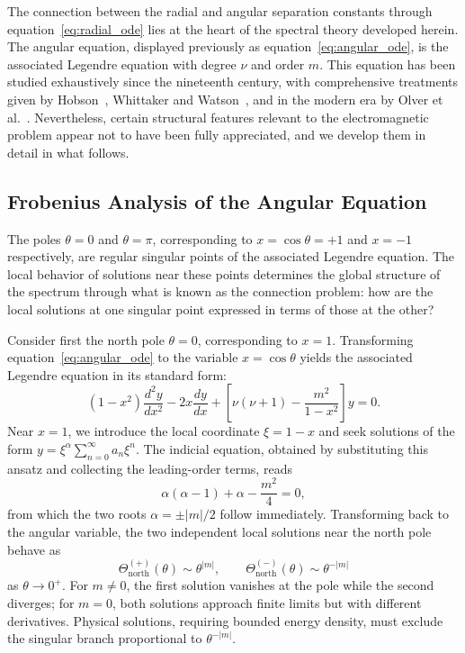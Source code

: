 \documentclass[
  aip,
  amsmath,amssymb,
  preprint
]{revtex4-1}
\begin{document}
The connection between the radial and angular separation constants through equation~\eqref{eq:radial_ode} lies at the heart of the spectral theory developed herein. The angular equation, displayed previously as equation~\eqref{eq:angular_ode}, is the associated Legendre equation with degree $\nu$ and order $m$. This equation has been studied exhaustively since the nineteenth century, with comprehensive treatments given by Hobson~\cite{Hobson1931}, Whittaker and Watson~\cite{WhittakerWatson1927}, and in the modern era by Olver et al.~\cite{DLMF}. Nevertheless, certain structural features relevant to the electromagnetic problem appear not to have been fully appreciated, and we develop them in detail in what follows.


\subsection{Frobenius Analysis of the Angular Equation}
\label{subsec:frobenius}

The poles $\theta = 0$ and $\theta = \pi$, corresponding to $x = \cos\theta = +1$ and $x = -1$ respectively, are regular singular points of the associated Legendre equation. The local behavior of solutions near these points determines the global structure of the spectrum through what is known as the connection problem: how are the local solutions at one singular point expressed in terms of those at the other?

Consider first the north pole $\theta = 0$, corresponding to $x = 1$. Transforming equation~\eqref{eq:angular_ode} to the variable $x = \cos\theta$ yields the associated Legendre equation in its standard form:
\begin{equation}
(1-x^2)\frac{d^2y}{dx^2} - 2x\frac{dy}{dx} + \left[\nu(\nu+1) - \frac{m^2}{1-x^2}\right]y = 0.
\label{eq:legendre_assoc_x}
\end{equation}
Near $x = 1$, we introduce the local coordinate $\xi = 1 - x$ and seek solutions of the form $y = \xi^\alpha \sum_{n=0}^\infty a_n \xi^n$. The indicial equation, obtained by substituting this ansatz and collecting the leading-order terms, reads
\begin{equation}
\alpha(\alpha - 1) + \alpha - \frac{m^2}{4} = 0,
\end{equation}
from which the two roots $\alpha = \pm|m|/2$ follow immediately. Transforming back to the angular variable, the two independent local solutions near the north pole behave as
\begin{equation}
\Theta^{(+)}_{\text{north}}(\theta) \sim \theta^{|m|}, \qquad \Theta^{(-)}_{\text{north}}(\theta) \sim \theta^{-|m|}
\label{eq:north_pole_behavior}
\end{equation}
as $\theta \to 0^+$. For $m \neq 0$, the first solution vanishes at the pole while the second diverges; for $m = 0$, both solutions approach finite limits but with different derivatives. Physical solutions, requiring bounded energy density, must exclude the singular branch proportional to $\theta^{-|m|}$.
\end{document}
